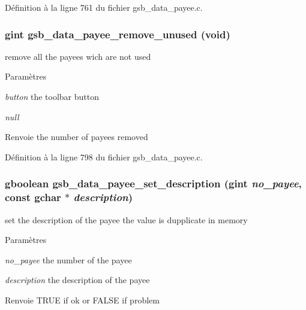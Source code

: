Définition à la ligne 761 du fichier gsb\_\-data\_\-payee.c.

\subsubsection[{gsb\_\-data\_\-payee\_\-remove\_\-unused}]{\setlength{\rightskip}{0pt plus 5cm}gint gsb\_\-data\_\-payee\_\-remove\_\-unused (void)}\label{gsb__data__payee_8h_ac57729c4bcccf5d7a6eb06da6a87a8f1}
remove all the payees wich are not used


\begin{DoxyParams}{Paramètres}
\item[{\em button}]the toolbar button \item[{\em null}]\end{DoxyParams}
\begin{DoxyReturn}{Renvoie}
the number of payees removed 
\end{DoxyReturn}


Définition à la ligne 798 du fichier gsb\_\-data\_\-payee.c.

\subsubsection[{gsb\_\-data\_\-payee\_\-set\_\-description}]{\setlength{\rightskip}{0pt plus 5cm}gboolean gsb\_\-data\_\-payee\_\-set\_\-description (gint {\em no\_\-payee}, \/  const gchar $\ast$ {\em description})}\label{gsb__data__payee_8h_abf0193464c60b6a28f498ac42fe72525}
set the description of the payee the value is dupplicate in memory


\begin{DoxyParams}{Paramètres}
\item[{\em no\_\-payee}]the number of the payee \item[{\em description}]the description of the payee\end{DoxyParams}
\begin{DoxyReturn}{Renvoie}
TRUE if ok or FALSE if problem 
\end{DoxyReturn}



